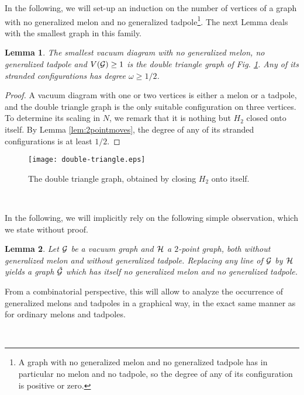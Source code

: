 \documentclass[10pt]{article}
\theoremstyle{plain}
\newtheorem{lemma}{Lemma}
\theoremstyle{definition}
\newcommand{\cG}{{\cal G}}
\newcommand{\cH}{{\cal H}}
\begin{document}
In the following, we will set-up an induction on the number of vertices of a graph with no generalized melon and no generalized tadpole\footnote{A graph with no generalized melon and no generalized tadpole has in particular no melon and no tadpole, so the degree of any of its configuration is positive or zero.}. The next Lemma deals with the smallest graph in this family. 
\begin{lemma}\label{lem:init}
The smallest vacuum diagram with no generalized melon, no generalized tadpole and $V(\cG) \geq 1$ is the double triangle graph of Fig. \ref{fig:double-triangle}. Any of its stranded configurations has degree $\omega \geq 1/2$.
\end{lemma}
\begin{proof}
A vacuum diagram with one or two vertices is either a melon or a tadpole, and the double triangle graph is the only suitable configuration on three vertices. To determine its scaling in $N$, we remark that it is nothing but $H_2$ closed onto itself. By Lemma \ref{lem:2pointmoves}, the degree of any of its stranded configurations is at least $1/2$. 
\end{proof}


\begin{figure}[htb]
 \begin{center}
 \texttt{[image: double-triangle.eps]}  
 \caption{The double triangle graph, obtained by closing $H_2$ onto itself.} \label{fig:double-triangle}
 \end{center}
 \end{figure}

\

In the following, we will implicitly rely on the following simple observation, which we state without proof.
\begin{lemma}\label{lem:gen_comb}
Let $\cG$ be a vacuum graph and $\cH$ a $2$-point graph, both without generalized melon and without generalized tadpole. Replacing any line of $\cG$ by $\cH$ yields a graph $\tilde{\cG}$ which has itself no generalized melon and no generalized tadpole.
\end{lemma}
\noindent From a combinatorial perspective, this will allow to analyze the occurrence of generalized melons and tadpoles in a graphical way, in the exact same manner as for ordinary melons and tadpoles.  

\
\end{document}
